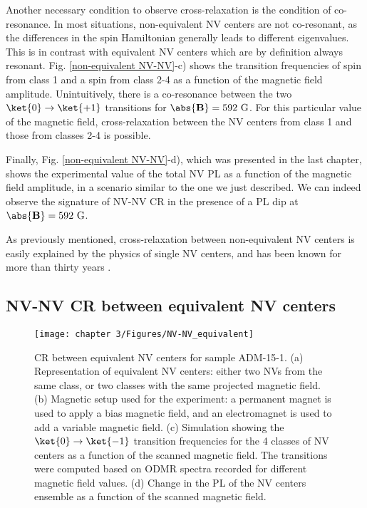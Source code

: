 \documentclass[a4paper, 11pt]{book}
\begin{document}
Another necessary condition to observe cross-relaxation is the condition of co-resonance. In most situations, non-equivalent NV centers are not co-resonant, as the differences in the spin Hamiltonian generally leads to different eigenvalues. This is in contrast with equivalent NV centers which are by definition always resonant. Fig. \ref{non-equivalent NV-NV}-c) shows the transition frequencies of spin from class 1 and a spin from class 2-4 as a function of the magnetic field amplitude. Unintuitively, there is a co-resonance between the two $\ket{0} \to \ket{+1}$ transitions for $\abs{\mathbf{B}}=592\ \rm G$. For this particular value of the magnetic field, cross-relaxation between the NV centers from class 1 and those from classes 2-4 is possible.

Finally, Fig. \ref{non-equivalent NV-NV}-d), which was presented in the last chapter, shows the experimental value of the total NV PL as a function of the magnetic field amplitude, in a scenario similar to the one we just described. We can indeed observe the signature of NV-NV CR in the presence of a PL dip at $\abs{\mathbf{B}}=592\ \rm G$.

As previously mentioned, cross-relaxation between non-equivalent NV centers is easily explained by the physics of single NV centers, and has been known for more than thirty years \citep{holliday1989optical, van1989cross}.

\subsection{NV-NV CR between equivalent NV centers}

\begin{figure}[h]
\centering
\texttt{[image: chapter 3/Figures/NV-NV\_equivalent]}
\caption{CR between equivalent NV centers for sample ADM-15-1. (a) Representation of equivalent NV centers: either two NVs from the same class, or two classes with the same projected magnetic field. (b) Magnetic setup used for the experiment: a permanent magnet is used to apply a bias magnetic field, and an electromagnet is used to add a variable magnetic field. (c) Simulation showing the $\ket{0}\to\ket{-1}$ transition frequencies for the 4 classes of NV centers as a function of the scanned magnetic field. The transitions were computed based on ODMR spectra recorded for different magnetic field values. (d) Change in the PL of the NV centers ensemble as a function of the scanned magnetic field.}
\label{equivalent NV-NV}
\end{figure}
\end{document}
